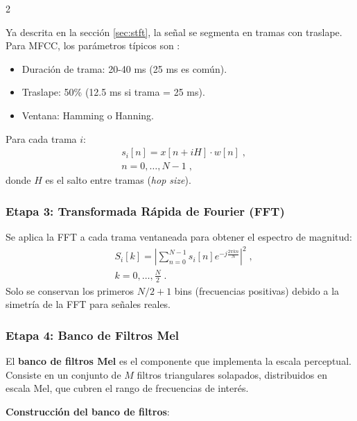 \documentclass[12pt]{report}
\newenvironment{tightmulticols}{%
  \begin{multicols}{2}
  \setlength{\parskip}{1.2pt}
  \linespread{1}\selectfont
}{%
  \end{multicols}
}
\begin{document}
\begin{tightmulticols}
\noindent Ya descrita en la sección \ref{sec:stft}, la señal se segmenta en tramas con traslape. Para MFCC, los parámetros típicos son \cite{ruvinga2023}:

\begin{itemize}
    \item Duración de trama: 20-40 ms (25 ms es común).
    \item Traslape: 50\% (12.5 ms si trama = 25 ms).
    \item Ventana: Hamming o Hanning.
\end{itemize}

\noindent Para cada trama $i$:
\begin{equation}
    \begin{split}
    &s_i[n] = x[n + iH] \cdot w[n] \; , \\[0.6ex]
    &n = 0, \ldots, N-1 \; ,
    \end{split}
\end{equation}
donde $H$ es el salto entre tramas (\textit{hop size}).

\subsubsection{Etapa 3: Transformada Rápida de Fourier (FFT)}

\noindent Se aplica la FFT a cada trama ventaneada para obtener el espectro de magnitud:
\begin{equation}
    \begin{split}
    &S_i[k] = \left|\sum_{n=0}^{N-1} s_i[n] e^{-j\frac{2\pi kn}{N}}\right|^2 \; , \\[0.6ex]
    &k = 0, \ldots, \frac{N}{2} \; .
    \end{split}
\end{equation}
\noindent Solo se conservan los primeros $N/2 + 1$ bins (frecuencias positivas) debido a la simetría de la FFT para señales reales.

\subsubsection{Etapa 4: Banco de Filtros Mel}

\noindent El \textbf{banco de filtros Mel} es el componente que implementa la escala perceptual. Consiste en un conjunto de $M$ filtros triangulares solapados, distribuidos en escala Mel, que cubren el rango de frecuencias de interés.

\noindent\textbf{Construcción del banco de filtros}:


\end{tightmulticols}
\end{document}
